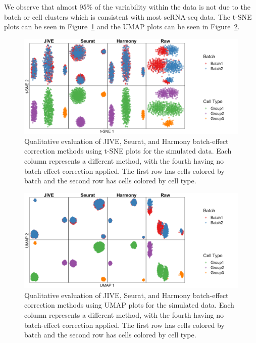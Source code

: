 \documentclass[unnumsec,webpdf,contemporary,large]{oup-authoring-template}%
\theoremstyle{thmstyleone}%
\theoremstyle{thmstyletwo}%
\theoremstyle{thmstylethree}%
\begin{document}
We observe that almost 95\% of the variability within the data is not due to the batch or cell clusters which is consistent with most scRNA-seq data. The t-SNE plots can be seen in Figure~\ref{fig:tsne_simdata} and the UMAP plots can be seen in Figure~\ref{fig:umap_simdata}.

\begin{figure}[ht]
    \centering 
    \includegraphics[width=1\columnwidth]{tsne_simdata} 
    \caption[t-SNE Plots for Simulated Data]{Qualitative evaluation of JIVE, Seurat, and Harmony batch-effect correction methods using t-SNE plots for the simulated data. Each column represents a different method, with the fourth having no batch-effect correction applied. The first row has cells colored by batch and the second row has cells colored by cell type.}
    \label{fig:tsne_simdata}
\end{figure}

\begin{figure}[ht]
    \centering 
    \includegraphics[width=1\columnwidth]{umap_simdata} 
    \caption[UMAP Plots for Simulated Data]{Qualitative evaluation of JIVE, Seurat, and Harmony batch-effect correction methods using UMAP plots for the simulated data. Each column represents a different method, with the fourth having no batch-effect correction applied. The first row has cells colored by batch and the second row has cells colored by cell type.}
    \label{fig:umap_simdata} 
\end{figure}
\end{document}
